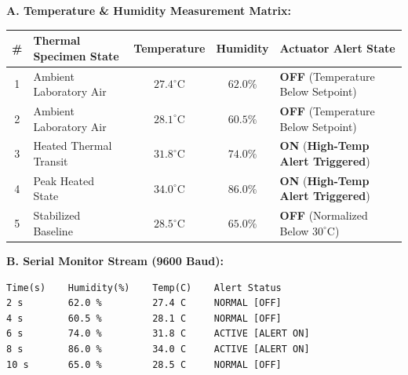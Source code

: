 \documentclass[10pt,a4paper]{article}
\begin{document}
\noindent
\textbf{A. Temperature \& Humidity Measurement Matrix:}\par\vspace{0.06cm}
{\footnotesize
\setlength{\tabcolsep}{6pt}
\renewcommand{\arraystretch}{1.18}
\begin{tabularx}{\textwidth}{|c|p{4.2cm}|c|c|X|}
\hline
\textbf{\#} & \textbf{Thermal Specimen State} & \textbf{Temperature} & \textbf{Humidity} & \textbf{Actuator Alert State} \\
\hline
1 & Ambient Laboratory Air & $27.4^\circ\text{C}$ & $62.0\%$ & \textbf{OFF} (Temperature Below Setpoint) \\
2 & Ambient Laboratory Air & $28.1^\circ\text{C}$ & $60.5\%$ & \textbf{OFF} (Temperature Below Setpoint) \\
3 & Heated Thermal Transit & $31.8^\circ\text{C}$ & $74.0\%$ & \textbf{ON} (\textbf{High-Temp Alert Triggered}) \\
4 & Peak Heated State & $34.0^\circ\text{C}$ & $86.0\%$ & \textbf{ON} (\textbf{High-Temp Alert Triggered}) \\
5 & Stabilized Baseline & $28.5^\circ\text{C}$ & $65.0\%$ & \textbf{OFF} (Normalized Below $30^\circ\text{C}$) \\
\hline
\end{tabularx}
}

\vspace{0.22cm}

\noindent
\textbf{B. Serial Monitor Stream (9600 Baud):}\par\vspace{0.05cm}
\begin{lstlisting}[style=bwTerminal]
Time(s)    Humidity(%)    Temp(C)    Alert Status
2 s        62.0 %         27.4 C     NORMAL [OFF]
4 s        60.5 %         28.1 C     NORMAL [OFF]
6 s        74.0 %         31.8 C     ACTIVE [ALERT ON]
8 s        86.0 %         34.0 C     ACTIVE [ALERT ON]
10 s       65.0 %         28.5 C     NORMAL [OFF]
\end{lstlisting}
\end{document}

